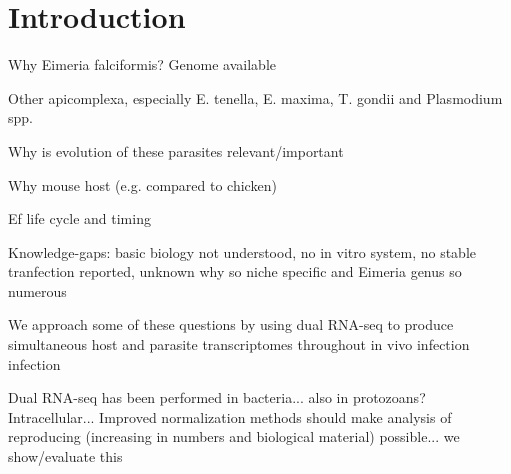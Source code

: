 \documentclass{bmcart}
\begin{document}



\section*{Introduction}
\item{Why Eimeria falciformis? Genome available}

\item{Other apicomplexa, especially E. tenella, E. maxima, T. gondii and Plasmodium spp.}

\item{Why is evolution of these parasites relevant/important}

\item{Why mouse host (e.g. compared to chicken)}

\item{Ef life cycle and timing}

\item{Knowledge-gaps: basic biology not understood, no in vitro system, 
no stable tranfection reported, unknown why so niche specific and Eimeria genus so numerous}

\item{We approach some of these questions by using dual RNA-seq to produce simultaneous host and parasite 
transcriptomes throughout in vivo infection infection}

\item{Dual RNA-seq has been performed in bacteria... also in protozoans? Intracellular... Improved normalization methods 
should make analysis of reproducing (increasing in numbers and biological material) possible... we show/evaluate this}
\end{document}
